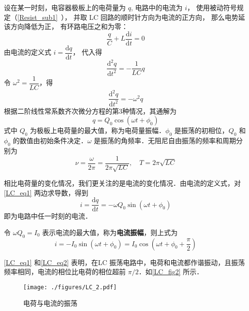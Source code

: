 设在某一时刻，电容器极板上的电荷量为 $q$, 电路中的电流为 $i$， 使用被动符号规定（\autoref{Resist_sub1}~）， 并取 LC 回路的顺时针方向为电流的正方向， 那么电势延该方向降低为正， 有环路电压之和为零：
\begin{equation}
\frac{q}{C} + L \frac{\mathrm{d} i}{\mathrm{d} t} = 0
\end{equation}
由电流的定义式 $i=\dfrac{\mathrm{d} q}{\mathrm{d} t}$， 代入得
\begin{equation}
\frac{\mathrm{d}^{2} q}{\mathrm{d} t^{2}}=-\frac{1}{L C} q
\end{equation}
令 $\omega^{2}=\dfrac{1}{L C}$，得
\begin{equation}
\frac{\mathrm{d}^{2} q}{\mathrm{d} t^{2}}=-\omega^{2} q
\end{equation}
根据二阶线性常系数齐次微分方程的第3种情况，其通解为
\begin{equation} \label{LC_eq1}
q=Q_{0} \cos \left(\omega t+\phi_{0}\right)
\end{equation}
式中 $Q_0$ 为极板上电荷量的最大值，称为电荷量振幅．$\phi_0$ 是振荡的初相位，$Q_0$ 和 $\phi_0$ 的数值由初始条件决定．$\omega$ 是振荡的角频率．无阻尼自由振荡的频率和周期分别为
\begin{equation}
\nu=\frac{\omega}{2 \pi}=\frac{1}{2 \pi \sqrt{L C}}, \quad T=2 \pi \sqrt{L C}
\end{equation}

相比电荷量的变化情况，我们更关注的是电流的变化情况．由电流的定义式，对\autoref{LC_eq1} 两边求导数，得到
\begin{equation}
i=\frac{\mathrm{d} q}{\mathrm{d} t}=-\omega Q_{0} \sin \left(\omega t+\phi_{0}\right)
\end{equation}
即为电路中任一时刻的电流．

令 $\omega Q_0=I_0$ 表示电流的最大值，称为\textbf{电流振幅}，则上式为
\begin{equation} \label{LC_eq2}
i=-I_{0} \sin \left(\omega t+\phi_{0}\right)=I_{0} \cos \left(\omega t+\phi_{0}+\frac{\pi}{2}\right)
\end{equation}

\autoref{LC_eq1} 和\autoref{LC_eq2} 表明，在LC 振荡电路中，电荷和电流都作谐振动，且振荡频率相同，电流的相位比电荷的相位超前 $\pi/2$．如\autoref{LC_fig2} 所示．

\begin{figure}[ht]
\centering
\texttt{[image: ./figures/LC\_2.pdf]}
\caption{电荷与电流的振荡} \label{LC_fig2}
\end{figure}

